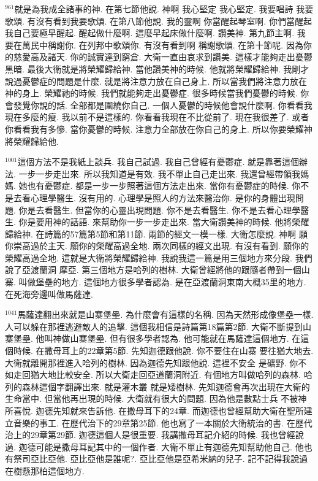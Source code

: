 \documentclass{book}
\begin{document}
$^{961}$就是為我成全諸事的神.
在第七節他說.
神啊 我心堅定 我心堅定.
我要唱詩 我要歌頌.
有沒有看到我要歌頌.
在第八節他說.
我的靈啊 你當醒起琴室啊.
你們當醒起 我自己要極早醒起.
醒起做什麼啊.
這麼早起床做什麼啊.
讚美神.
第九節主啊.
我要在萬民中稱謝你.
在列邦中歌頌你.
有沒有看到啊 稱謝歌頌.
在第十節呢.
因為你的慈愛高及諸天.
你的誠實達到窮倉.
大衛一直由哀求到讚美.
這樣才能夠走出憂鬱黑暗.
最後大衛就是將榮耀歸給神.
當他讚美神的時候.
他就將榮耀歸給神.
我剛才說過憂鬱症的問題是什麼.
就是將注意力放在自己身上.
所以當我們將注意力放在神的身上.
榮耀祂的時候.
我們就能夠走出憂鬱症.
很多時候當我們憂鬱的時候.
你會發覺你說的話.
全部都是圍繞你自己.
一個人憂鬱的時候他會說什麼啊.
你看看我現在多麼的瘦.
我以前不是這樣的.
你看看我現在不比從前了.
現在我很差了.
或者你看看我有多慘.
當你憂鬱的時候.
注意力全部放在你自己的身上.
所以你要榮耀神將榮耀歸給他.

$^{1001}$這個方法不是我紙上談兵.
我自己試過.
我自己曾經有憂鬱症.
就是靠著這個辦法.
一步一步走出來.
所以我知道是有效.
我不單止自己走出來.
我還曾經帶領我媽媽.
她也有憂鬱症.
都是一步一步照著這個方法走出來.
當你有憂鬱症的時候.
你不是去看心理學醫生.
沒有用的.
心理學是照人的方法來醫治你.
是你的身體出現問題.
你是去看醫生.
但當你的心靈出現問題.
你不是去看醫生.
你不是去看心理學醫生.
你是要用神的話語.
來幫助你一步一步走出來.
當大衛讚美神的時候.
他將榮耀歸給神.
在詩篇的57篇第5節和第11節.
兩節的經文一模一樣.
大衛怎麼說.
神啊 願你崇高過於主天.
願你的榮耀高過全地.
兩次同樣的經文出現.
有沒有看到.
願你的榮耀高過全地.
這就是大衛將榮耀歸給神.
我說我這一篇是用三個地方來分段.
我們說了亞渡蘭洞 摩亞.
第三個地方是哈列的樹林.
大衛曾經將他的跟隨者帶到一個山寨.
叫做堡壘的地方.
這個地方很多學者認為.
是在亞渡蘭洞東南大概35里的地方.
在死海旁邊叫做馬薩達.

$^{1041}$馬薩達翻出來就是山寨堡壘.
為什麼會有這樣的名稱.
因為天然形成像堡壘一樣.
人可以躲在那裡逃避敵人的追擊.
這個我相信是詩篇第18篇第2節.
大衛不斷提到山寨堡壘.
他叫神做山寨堡壘.
但有很多學者認為.
他可能就在馬薩達這個地方.
在這個時候.
在撒母耳上的22章第5節.
先知迦德跟他說.
你不要住在山寨 要往猶大地去.
大衛就離開那裡進入哈列的樹林.
因為迦德先知跟他說.
這裡不安全 是礦野.
你不如走回猶大地比較安全.
所以大衛走回亞道蘭洞附近.
有個地方叫做哈列的森林.
哈列的森林這個字翻譯出來.
就是灌木叢 就是矮樹林.
先知迦德會再次出現在大衛的生命當中.
但當他再出現的時候.
大衛就有很大的問題.
因為他是數點士兵 不被神所喜悅.
迦德先知就來告訴他.
在撒母耳下的24章.
而迦德也曾經幫助大衛在聖所建立音樂的事工.
在歷代治下的29章第25節.
他也寫了一本關於大衛統治的書.
在歷代治上的29章第29節.
迦德這個人是很重要.
我講撒母耳記介紹的時候.
我也曾經說過.
迦德可能是撒母耳記其中的一個作者.
大衛不單止有迦德先知幫助他自己.
他也有祭司亞比亞他.
亞比亞他是誰呢?.
亞比亞他是亞希米納的兒子.
記不記得我說過在樹懸那柏這個地方.
\end{document}
